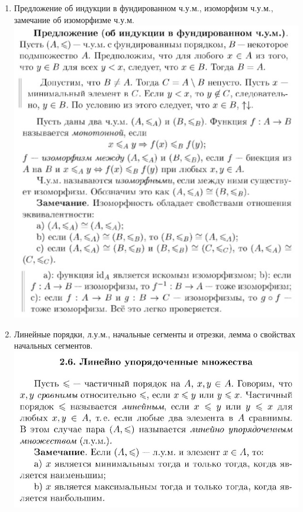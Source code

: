 \documentclass[a4paper]{article}
\theoremstyle{definition}
\begin{document}
\begin{enumerate}
 \item Предложение об индукции в фундированном ч.у.м., изоморфизм ч.у.м., замечание об изоморфизме ч.у.м.
       \mbox{}\\\includegraphics[scale=0.85]{10.jpg}\\
 \item Линейные порядки, л.у.м., начальные сегменты и отрезки, лемма о свойствах начальных сегментов.
       \mbox{}\\ \includegraphics[scale=0.4]{11_1.jpg}\\

\end{enumerate}
\end{document}
